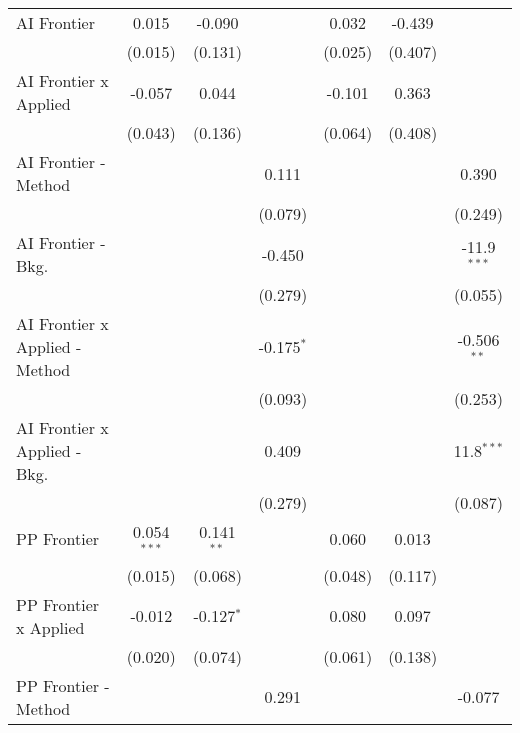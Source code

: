 \begin{tabular}{lcccccc}
   AI Frontier                    & 0.015         & -0.090        &                & 0.032   & -0.439        &   \\   
                                  & (0.015)       & (0.131)       &                & (0.025) & (0.407)       &   \\   
   AI Frontier x Applied          & -0.057        & 0.044         &                & -0.101  & 0.363         &   \\   
                                  & (0.043)       & (0.136)       &                & (0.064) & (0.408)       &   \\   
   AI Frontier - Method           &               &               & 0.111          &         &               & 0.390\\   
                                  &               &               & (0.079)        &         &               & (0.249)\\   
   AI Frontier - Bkg.             &               &               & -0.450         &         &               & -11.9$^{***}$\\   
                                  &               &               & (0.279)        &         &               & (0.055)\\   
   AI Frontier x Applied - Method &               &               & -0.175$^{*}$   &         &               & -0.506$^{**}$\\   
                                  &               &               & (0.093)        &         &               & (0.253)\\   
   AI Frontier x Applied - Bkg.   &               &               & 0.409          &         &               & 11.8$^{***}$\\   
                                  &               &               & (0.279)        &         &               & (0.087)\\   
   PP Frontier                    & 0.054$^{***}$ & 0.141$^{**}$  &                & 0.060   & 0.013         &   \\   
                                  & (0.015)       & (0.068)       &                & (0.048) & (0.117)       &   \\   
   PP Frontier x Applied          & -0.012        & -0.127$^{*}$  &                & 0.080   & 0.097         &   \\   
                                  & (0.020)       & (0.074)       &                & (0.061) & (0.138)       &   \\   
   PP Frontier - Method           &               &               & 0.291          &         &               & -0.077\\   

\end{tabular}
